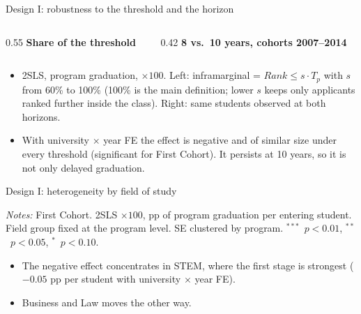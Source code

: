 \documentclass{beamer}
\newcommand{\sym}[1]{\ensuremath{^{#1}}}
\begin{document}
\begin{frame}{Design I: robustness to the threshold and the horizon}
\begin{columns}[T,onlytextwidth]
\begin{column}{0.55\textwidth}
\centering
\tiny
\textbf{Share of the threshold}

\vspace{0.04cm}
\resizebox{\linewidth}{!}{}
\end{column}
\begin{column}{0.42\textwidth}
\centering
\tiny
\textbf{8 vs.\ 10 years, cohorts 2007--2014}

\vspace{0.04cm}
\resizebox{\linewidth}{!}{}
\end{column}
\end{columns}

\vspace{0.12cm}
\begin{itemize}\scriptsize
    \setlength{\itemsep}{1pt}
    \item 2SLS, program graduation, $\times 100$. Left: inframarginal = $Rank\le s\cdot T_p$ with $s$ from 60\% to 100\% (100\% is the main definition; lower $s$ keeps only applicants ranked further inside the class). Right: same students observed at both horizons.
    \item With university $\times$ year FE the effect is negative and of similar size under every threshold (significant for First Cohort).
    It persists at 10 years, so it is not only delayed graduation.
\end{itemize}
\end{frame}

\begin{frame}{Design I: heterogeneity by field of study}
\centering
\tiny
\resizebox{0.95\textwidth}{!}{}

\vspace{0.08cm}
\parbox{0.97\textwidth}{\tiny \textit{Notes:} First Cohort. 2SLS $\times 100$, pp of program graduation per entering student.
Field group fixed at the program level. SE clustered by program. \sym{***}~$p<0.01$, \sym{**}~$p<0.05$, \sym{*}~$p<0.10$.}

\vspace{0.06cm}
\begin{itemize}\scriptsize
    \item The negative effect concentrates in STEM, where the first stage is strongest ($-0.05$ pp per student with university $\times$ year FE).
    \item Business and Law moves the other way.
\end{itemize}
\end{frame}
\end{document}
